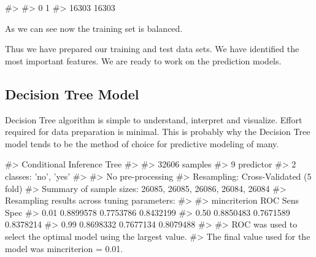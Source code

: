 \begin{Schunk}
\begin{Soutput}
#> 
#>     0     1 
#> 16303 16303
\end{Soutput}
\end{Schunk}

As we can see now the training set is balanced.

Thus we have prepared our training and test data sets. We have
identified the most important features. We are ready to work on the
prediction models.

\hypertarget{decision-tree-model}{%
\subsection{Decision Tree Model}\label{decision-tree-model}}

Decision Tree algorithm is simple to understand, interpret and
visualize. Effort required for data preparation is minimal. This is
probably why the Decision Tree model tends to be the method of choice
for predictive modeling of many.

\begin{Schunk}
\begin{Soutput}
#> Conditional Inference Tree 
#> 
#> 32606 samples
#>     9 predictor
#>     2 classes: 'no', 'yes' 
#> 
#> No pre-processing
#> Resampling: Cross-Validated (5 fold) 
#> Summary of sample sizes: 26085, 26085, 26086, 26084, 26084 
#> Resampling results across tuning parameters:
#> 
#>   mincriterion  ROC        Sens       Spec     
#>   0.01          0.8899578  0.7753786  0.8432199
#>   0.50          0.8850483  0.7671589  0.8378214
#>   0.99          0.8698332  0.7677134  0.8079488
#> 
#> ROC was used to select the optimal model using the largest value.
#> The final value used for the model was mincriterion = 0.01.
\end{Soutput}
\end{Schunk}

